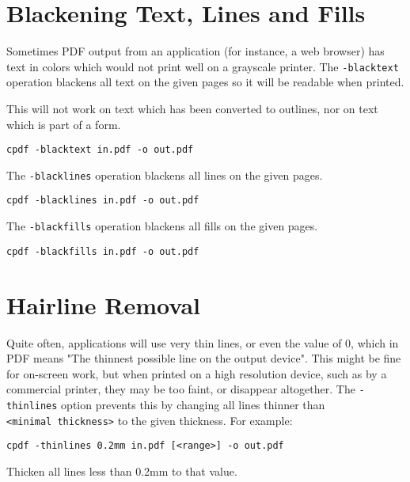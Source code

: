 \documentclass{book}
\begin{document}
  \section{Blackening Text, Lines and Fills}
  Sometimes PDF output from an application (for instance, a web browser) has
text in colors which would not print well on a grayscale printer. The
\texttt{-blacktext} operation blackens all text on the given pages so it will be readable
when printed.

  This will not work on text which has been converted to outlines, nor on text
which is part of a form.
  \begin{framed}
    \small\verb!cpdf -blacktext in.pdf -o out.pdf!
  \end{framed}


\noindent The \texttt{-blacklines} operation blackens all lines on the given pages.

  \begin{framed}
    \small\verb!cpdf -blacklines in.pdf -o out.pdf!
  \end{framed}


\noindent The \texttt{-blackfills} operation blackens all fills on the given pages.

  \begin{framed}
    \small\verb!cpdf -blackfills in.pdf -o out.pdf!
  \end{framed}

  \section{Hairline Removal}
  Quite often, applications will use very thin lines, or even the value of 0,
which in PDF means "The thinnest possible line on the output device". This
might be fine for on-screen work, but when printed on a high resolution device,
such as by a commercial printer, they may be too faint, or disappear
altogether. The \texttt{-thinlines} option prevents this by changing all lines
thinner than \texttt{<minimal~thickness>} to the given thickness. For example:
  \begin{framed}
  \small\noindent\verb!cpdf -thinlines 0.2mm in.pdf [<range>] -o out.pdf!

  \vspace{2.5mm}
  \noindent Thicken all lines less than 0.2mm to that value.
  \end{framed} 
\end{document}
